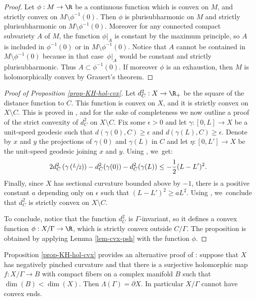 \begin{proof}
Let $\phi:M\to \R$ be a continuous function which is convex on $M$, and strictly convex on $M\setminus \phi^{-1}(0)$. Then $\phi$ is plurisubharmonic on $M$ and strictly plurisubharmonic on $M\setminus \phi^{-1}(0)$. Moreover for any connected compact subvariety $A$ of $M$, the function $\phi\vert_{A}$ is constant by the maximum principle, so $A$ is included in $\phi^{-1}(0)$ or in $M\setminus \phi^{-1}(0)$. Notice that $A$ cannot be contained in $M\setminus \phi^{-1}(0)$ because in that case~$\phi\vert_{A}$ would be constant and strictly plurisubharmonic. Thus $A\subset \phi^{-1}(0)$. If moreover $\phi$ is an exhaustion, then $M$ is holomorphically convex by Grauert's theorem.
\end{proof}

\begin{proof}[Proof of Proposition \ref{prop-KH-hol-cvx}]
Let $d_C^{2}:X\to \R_+$ be the square of the distance function to $C$. This function is convex on $X$, and it is strictly convex on $X\setminus C$. This is proved in \cite[Lem.\,4.5]{benoistHarmonicQuasiisometricMaps2023}, and for the sake of completeness we now outline a proof of the strict convexity of $d_C^{2}$ on $X\setminus C$. Fix some $\epsilon>0$ and let $\gamma:[0,L]\to X$ be a unit-speed geodesic such that $d(\gamma(0),C)\ge \epsilon$ and $d(\gamma(L),C)\ge \epsilon$. Denote by $x$ and $y$ the projections of $\gamma(0)$ and $\gamma(L)$ in $C$ and let $\eta:[0,L']\to X$ be the unit-speed geodesic joining $x$ and $y$. Using \cite[Cor.\,2.1.3 - Form.\,2.1(iv)]{korevaarSobolevSpacesHarmonic1993}, we~get:
\begin{equation*}
2d_C^{2}\left(\gamma\left(\sfrac{L}{2}\right)\right) - d_C^{2}(\gamma(0)) - d_C^{2}(\gamma(L)) \le -\frac{1}{2}(L-L')^{2}.
\end{equation*}
Finally, since $X$ has sectional curvature bounded above by $-1$, there is a positive constant $a$ depending only on $\epsilon$ such that $(L-L')^{2}\ge aL^{2}$. Using \cite[Lem.\,1]{greeneConvexFunctionsManifolds1976manuel}, we~conclude that $d_C^{2}$ is strictly convex on $X\setminus C$.

To conclude, notice that the function $d_C^{2}$ is $\Gamma$\nobreakdash-invariant, so it defines a convex function $\phi:X/\Gamma\to \R$, which is strictly convex outside $C/\Gamma$. The proposition is obtained by applying Lemma \ref{lem-cvx-psh} with the function $\phi$.
\end{proof}

\begin{remark}
Proposition \ref{prop-KH-hol-cvx} provides an alternative proof of \cite[Prop.\,5]{kapovichSurveyComplexHyperbolic2022}: suppose that $X$ has negatively pinched curvature and that there is a surjective holomorphic map $f:X/\Gamma \to B$ with compact fibers on a complex manifold $B$ such that \hbox{$\dim(B)<\dim(X)$}. Then $\Lambda(\Gamma)=\partial X$. In particular $X/\Gamma$ cannot have convex ends.
\end{remark}


